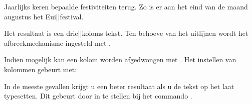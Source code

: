 Jaarlijks keren bepaalde festiviteiten terug. Zo is er aan
het eind van de maand augustus het Eui||festival.
\stopkolommen
\stopbuffer

\typebuffer


Het resultaat is een drie||koloms tekst. Ten behoeve van het
uitlijnen wordt het afbreekmechanisme ingesteld met
.

{\switchnaarkorps[9pt]\haalbuffer}

Indien mogelijk kan een kolom worden afgedwongen met
\type{\kolom}. Het instellen van kolommen gebeurt met:


In de meeste gevallen krijgt u een beter resultaat
als u de tekst op het  laat typesetten. Dit
gebeurt door  in te stellen bij het commando
\type {\stellayoutin}.

\stoponderdeel
